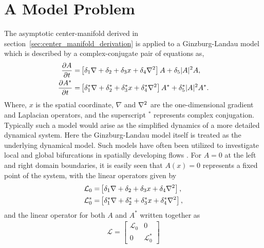 \section{A Model Problem}
\label{sec:ginzburg_landau}

The asymptotic center-manifold derived in section~\ref{sec:center_manifold_derivation} is applied to a Ginzburg-Landau model which is described by a complex-conjugate pair of equations as,
\begin{subequations}
	\label{eqn:ginzburg_landau}
	\begin{align}
		\dfrac{\partial A}{\partial t} =& \left[\delta_{1}\nabla + \delta_{2} + \delta_{3}x + \delta_{4}\nabla^{2}\right]A + \delta_{5}|A|^{2}A, \\
		\dfrac{\partial A^{*}}{\partial t} =& \left[\delta^{*}_{1}\nabla + \delta^{*}_{2} + \delta^{*}_{3}x + \delta^{*}_{4}\nabla^{2}\right]A^{*} + \delta^{*}_{5}|A|^{2}A^{*}. 
	\end{align}
\end{subequations}
Where, $x$ is the spatial coordinate, $\nabla$ and $\nabla^{2}$ are the one-dimensional gradient and Laplacian operators, and the superscript $^{*}$ represents complex conjugation. Typically such a model would arise as the simplified dynamics of a more detailed dynamical system. Here the Ginzburg-Landau model itself is treated as the underlying dynamical model. Such models have often been utilized to investigate local and global bifurcations in spatially developing flows \citep{chomaz88,chomaz05}. For $A=0$ at the left and right domain boundaries, it is easily seen that $A(x)=0$ represents a fixed point of the system, with the linear operators given by
\begin{align}
	\mathcal{L}_{0}	=& \left[\delta_{1}\nabla + \delta_{2} + \delta_{3}x + \delta_{4}\nabla^{2}\right], \nonumber \\
	\mathcal{L}^{*}_{0} =&\left[\delta^{*}_{1}\nabla + \delta^{*}_{2} + \delta^{*}_{3}x + \delta^{*}_{4}\nabla^{2}\right], \nonumber
\end{align}
and the linear operator for both $A$ and $A^{*}$ written together as
\begin{eqnarray}
	\mathcal{L} = \begin{bmatrix}
		\mathcal{L}_{0}		& 0 \\
		0								  & \mathcal{L}^{*}_{0}
	\end{bmatrix}
\end{eqnarray}

